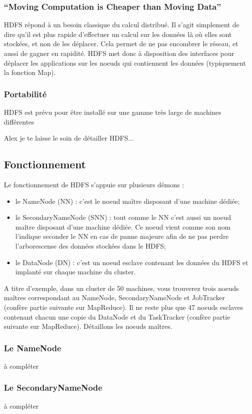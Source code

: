 \subsubsection{``Moving Computation is Cheaper than Moving Data''}
\label{sec:moving-comp-cheap}

\par HDFS répond à un besoin classique du calcul distribué. Il s'agit simplement de dire qu'il est plus rapide d'effectuer un calcul sur les données là où elles sont stockées, et non de les déplacer. Cela permet de ne pas encombrer le réseau, et aussi de gagner en rapidité. HDFS met donc à disposition des interfaces pour déplacer les applications sur les noeuds qui contiennent les données (typiquement la fonction Map).

\subsubsection{Portabilité}
\label{sec:portabilite}

\par HDFS est prévu pour être installé sur une gamme très large de machines différentes


\par Alex je te laisse le soin de détailler HDFS...

\subsection{Fonctionnement}

\par Le fonctionnement de HDFS s'appuie sur plusieurs démons :

\begin{itemize}
\item le NameNode (NN) : c'est le noeud maître disposant d'une machine dédiée;
\item le SecondaryNameNode (SNN) : tout comme le NN c'est aussi un noeud maître disposant d'une machine dédiée. Ce noeud vient comme son nom l'indique seconder le NN en cas de panne majeure afin de ne pas perdre l'arborescense des données stockées dans le HDFS;
\item le DataNode (DN) : c'est un noeud esclave contenant les données du HDFS et implanté sur chaque machine du cluster.
\end{itemize}

\par A titre d'exemple, dans un cluster de 50 machines, vous trouverez trois noeuds maîtres correspondant au NameNode, SecondaryNameNode et JobTracker (confère partie suivante sur MapReduce). Il ne reste plus que 47 noeuds esclaves contenant chacun une copie du DataNode et du TaskTracker (confère partie suivante sur MapReduce). Détaillons les noeuds maîtres.

\subsubsection{Le NameNode}

\par à compléter

\subsubsection{Le SecondaryNameNode}

\par à compléter

